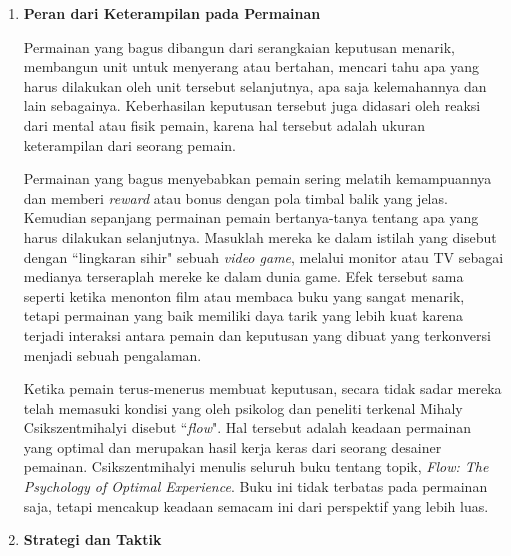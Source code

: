 \begin{enumerate}[label=\textbf{\alph*).}]
	
	\item \textbf{Peran dari Keterampilan pada Permainan}
	\setlength{\parindent}{0.8cm}

	Permainan yang bagus dibangun dari serangkaian keputusan menarik, membangun unit untuk menyerang atau bertahan, mencari tahu apa yang harus dilakukan oleh unit tersebut selanjutnya, apa saja kelemahannya dan lain sebagainya. Keberhasilan keputusan tersebut juga didasari oleh reaksi dari mental atau fisik pemain, karena hal tersebut adalah ukuran keterampilan dari seorang pemain.
	\vspace{1ex}

	Permainan yang bagus menyebabkan pemain sering melatih kemampuannya dan memberi \textit{reward} atau bonus dengan pola timbal balik yang jelas. Kemudian sepanjang permainan pemain bertanya-tanya tentang apa yang harus dilakukan selanjutnya. Masuklah mereka ke dalam istilah yang disebut dengan ``lingkaran sihir" sebuah \textit{video game}, melalui monitor atau TV sebagai medianya terseraplah mereke ke dalam dunia game. Efek tersebut sama seperti ketika menonton film atau membaca buku yang sangat menarik, tetapi permainan yang baik memiliki daya tarik yang lebih kuat karena terjadi interaksi antara pemain dan keputusan yang dibuat yang terkonversi menjadi sebuah pengalaman.
	\vspace{1ex}
	
	Ketika pemain terus-menerus membuat keputusan, secara tidak sadar mereka telah memasuki kondisi yang oleh psikolog dan peneliti terkenal Mihaly Csikszentmihalyi disebut ``\textit{flow}". Hal tersebut adalah keadaan permainan yang optimal dan merupakan hasil kerja keras dari seorang desainer pemainan. Csikszentmihalyi menulis seluruh buku tentang topik, \textit{Flow: The Psychology of Optimal Experience}. Buku ini tidak terbatas pada permainan saja, tetapi mencakup keadaan semacam ini dari perspektif yang lebih luas.
	\vspace{1ex}
	
	\item \textbf{Strategi dan Taktik}
	

\end{enumerate}

